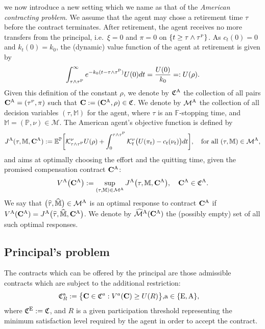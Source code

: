 \documentclass[11pt,a4paper]{article}
\numberwithin{equation}{section}
\def\dbE{\mathbb{E}}
\def\dbF{\mathbb{F}}
\def\dbM{\mathbb{M}}
\def\dbP{\mathbb{P}}
\newcommand{\cK}{\mathcal{K}}
\newcommand{\cM}{\mathcal{M}}
\newcommand{\Cbf}{\mathbf{C}}
\newcommand{\frakC}{\mathfrak{C}}
\def\no{\noindent}
\def\t {\tau}
\def\we {\wedge}
\newcommand{\bea}{\begin{eqnarray}}
\newcommand{\eea}{\end{eqnarray}}
\newcommand{\beaa}{\begin{eqnarray*}}
\newcommand{\eeaa}{\end{eqnarray*}}
\theoremstyle{definition}
\begin{document}
\no {\bf Agent can quit:} 
we now introduce a new setting which we name as that of the {\it American contracting problem}. We assume that the agent may chose a retirement time $\tau$ before the contract terminates.  
After retirement, the agent receives no more transfers from the principal, i.e.~$\xi=0$ and $\pi=0$ on $\{t\ge\t\wedge\tau^{\scriptscriptstyle\rm P}\}$. 
As $c_t(0)=0$ and $k_t(0)=k_0$, the (dynamic) value function of the agent at retirement is given by 
 \beaa
 \int_{\t\wedge\t^{\scriptscriptstyle\rm P}}^\infty e^{-k_0(t-\t\wedge\t^{\scriptscriptstyle\rm P})} U(0)dt
   =
 \frac{U(0)}{k_0}
   =:
 U(\rho).
 \eeaa
Given this definition of the constant $\rho$, we denote by $\frakC^{\rm A}$ the collection of all pairs $\Cbf^{\rm A}=(\tau^{\scriptscriptstyle\rm P},\pi)$ such that $\Cbf:=(\Cbf^{\rm A},\rho)\in\frakC$. 
We denote by $\cM^{\rm A}$ the collection of all decision variables $(\tau,\dbM)$ for the agent, where $\t$ is an $\dbF$-stopping time, and $\dbM=(\dbP,\nu)\in\cM$. 
The American agent's objective function is defined by
 \begin{equation*}
   J^{\rm A}(\t, \dbM, \Cbf^{\rm A})
    :=
   \dbE^{\dbP}\bigg[\cK^{\nu}_{\tau\we\t^{\scriptscriptstyle\rm P}} U(\rho)
                               +\int_0^{\tau\we\t^{\scriptscriptstyle\rm P}} \mathcal K^{\nu}_t \big(U(\pi_t)-c_t(\nu_t)\big)dt \bigg],
                               \quad\mbox{for all}~(\t,\dbM)\in\cM^{\rm A},
 \end{equation*}
and aims at optimally choosing the effort and the quitting time, given the promised compensation contract $\Cbf^{\rm A}$:
 \bea
 V^{\rm A}\big(\Cbf^{\rm A}\big) 
  :=
 \sup_{(\t,\dbM)\in\cM^{\rm A}} J^{\rm A}\big(\t, \dbM,\Cbf^{\rm A}\big), 
 \quad \Cbf^{\rm A}\in\frakC^{\rm A}.
 \eea
We say that $\big(\widehat\t,\widehat{\dbM}\big)\in\cM^{\rm A}$ is an optimal response to contract $\Cbf^{\rm A}$ if $V^{\rm A}(\Cbf^{\rm A})=J^{\rm A}\big(\widehat\t,\widehat{\dbM},\Cbf^{\rm A}\big)$. 
We denote by $\widehat{\cM}^{\rm A}(\Cbf^{\rm A})$ the (possibly empty) set of all such optimal responses.

\subsection{Principal's problem}
The contracts which can be offered by the principal are those admissible contracts which are subject to the additional restriction:
 \bea \label{def:FrakC}
    \mathfrak{C}^{\rm a}_R
    := 
    \big\{ \Cbf\in\frakC^a : V^a(\Cbf)\geq U(R)\big\},
    &{\rm a}\in\{{\rm E},{\rm A}\},&
 \eea
where $\frakC^{\rm E}:=\frakC$, and $R$ is a given participation threshold representing the minimum satisfaction level required by the agent in order to accept the contract.
\end{document}
